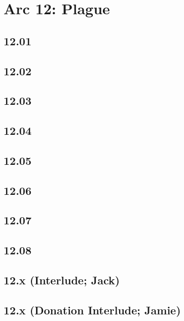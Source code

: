 \part{Arc 12: Plague}
 \chapter{12.01}
 \chapter{12.02}
 \chapter{12.03}
 \chapter{12.04}
 \chapter{12.05}
 \chapter{12.06}
 \chapter{12.07}
 \chapter{12.08}
 \chapter{12.x (Interlude; Jack)}
 \chapter{12.x (Donation Interlude; Jamie)}











